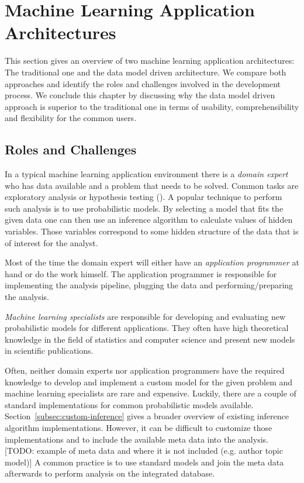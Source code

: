 \section{Machine Learning Application Architectures}

This section gives an overview of two machine learning application architectures: The traditional one and the data model driven architecture. We compare both approaches and identify the roles and challenges involved in the development process. We conclude this chapter by discussing why the data model driven approach is superior to the traditional one in terms of usability, comprehensibility and flexibility for the common users.

\subsection{Roles and Challenges}

In a typical machine learning application environment there is a \emph{domain expert} who has data available and a problem that needs to be solved. Common tasks are exploratory analysis or hypothesis testing (\cite{tukey1980we}). A popular technique to perform such analysis is to use probabilistic models. By selecting a model that fits the given data one can then use an inference algorithm to calculate values of hidden variables. Those variables correspond to some hidden structure of the data that is of interest for the analyst.

Most of the time the domain expert will either have an \emph{application programmer} at hand or do the work himself. The application programmer is responsible for implementing the analysis pipeline, plugging the data and performing/preparing the analysis.

\emph{Machine learning specialists} are responsible for developing and evaluating new probabilistic models for different applications. They often have high theoretical knowledge in the field of statistics and computer science and present new models in scientific publications.

Often, neither domain experts nor application programmers have the required knowledge to develop and implement a custom model for the given problem and machine learning specialists are rare and expensive. Luckily, there are a couple of standard implementations for common probabilistic models available. Section~\ref{subsec:custom-inference} gives a broader overview of existing inference algorithm implementations. However, it can be difficult to customize those implementations and to include the available meta data into the analysis. [TODO: example of meta data and where it is not included (e.g. author topic model)] A common practice is to use standard models and join the meta data afterwards to perform analysis on the integrated database.

